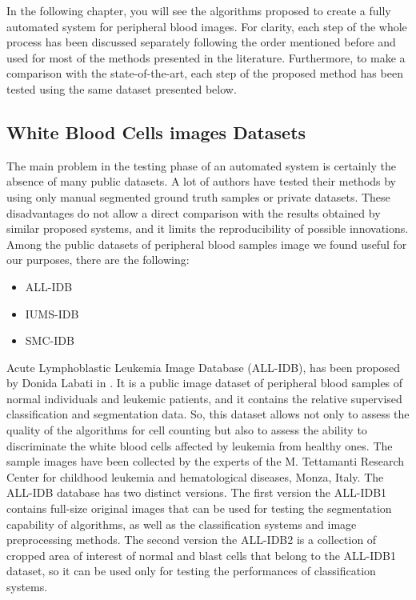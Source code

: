 \documentclass[final,a4paper,12pt,english]{UnicaPhdThesis3}
\begin{document}
In the following chapter, you will see the algorithms proposed to create a fully automated system for peripheral blood images. For clarity, each step of the whole process has been discussed separately following the order mentioned before and used for most of the methods presented in the literature. Furthermore, to make a comparison with the state-of-the-art, each step of the proposed method has been tested using the same dataset presented below.

\subsection{White Blood Cells images Datasets}
\label{wbc_datasets}
The main problem in the testing phase ​of an automated system is certainly the absence of many public datasets. A lot of authors have tested their methods by using only manual segmented ground truth samples or private datasets. These disadvantages do not allow a direct comparison with the results obtained by similar proposed systems, and it limits the reproducibility of possible innovations. Among the public datasets of peripheral blood samples image we found useful for our purposes, there are the following:
\begin{itemize}
	\item ALL-IDB \cite{Donida}
	\item IUMS-IDB \cite{Sarrafzadeh}
	\item SMC-IDB \cite{Mohamed}
\end{itemize} 
Acute Lymphoblastic Leukemia Image Database (\acs{ALL-IDB}), has been proposed by Donida Labati in \cite{Donida}. It is a public image dataset of peripheral blood samples of normal individuals and leukemic patients, and it contains the relative supervised classification and segmentation data. So, this dataset allows not only to assess the quality of the algorithms for cell counting but also to assess the ability to discriminate the white blood cells affected by leukemia from healthy ones. The sample images have been collected by the experts of the M. Tettamanti Research Center for childhood leukemia and hematological diseases, Monza, Italy. The ALL-IDB database has two distinct versions. The first version the ALL-IDB1 contains full-size original images that can be used for testing the segmentation capability of algorithms, as well as the classification systems and image preprocessing methods. The second version the ALL-IDB2 is a collection of cropped area of interest of normal and blast cells that belong to the ALL-IDB1 dataset, so it can be used only for testing the performances of classification systems.
\end{document}
